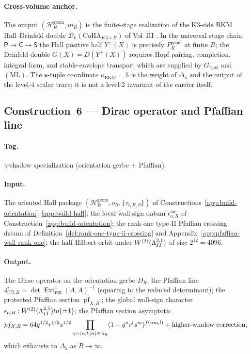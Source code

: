 \paragraph{Cross-volume anchor.}  The output
\((\mathcal H_R^{\mathrm{geom}},m_R)\) is the finite-stage realization
of the K3-side BKM Hall--Drinfeld double
\(\mathcal D_\hbar(\mathrm{CoHA}_{K3\times E})\) of Vol~III
\cite{CYQGVolIII}.  In the universal
stage chain \(\mathsf P\to\mathsf C\to\mathsf S\) the Hall positive half
\(Y^+(X)\) is precisely \(P_R^{\mathrm{geom}}\) at finite \(R\); the
Drinfeld double \(G(X)=D(Y^+(X))\) requires Hopf pairing, completion,
integral form, and stable-envelope transport which are supplied by
\(G_{\gamma,ab}\) and \((\mathrm{ML})\).  The κ-tuple coordinate
\(\kappa_{\mathrm{BKM}}=5\) is the weight of \(\Delta_5\) and the
output of the level-4 scalar trace; it is not a level-2 invariant of
the carrier itself.

\subsection{Construction~6 — Dirac operator and Pfaffian line}
\label{app:build-dirac-pfaffian}

\paragraph{Tag.} \(\gamma\)-shadow specialization
(orientation gerbe + Pfaffian).

\paragraph{Input.}
The oriented Hall package
\((\mathcal H_R^{\mathrm{geom}},o_R,\{\tau_{i,R,S}\})\) of
Constructions~\ref{app:build-orientation}--\ref{app:build-hall}; the
local wall-sign datum
\(\epsilon_{o,R}^{\mathrm{loc}}\) of
Construction~\ref{app:build-orientation}; the rank-one type-II
Pfaffian crossing datum of
Definition~\ref{def:rank-one-type-ii-crossing} and
Appendix~\ref{app:pfaffian-wall-rank-one}; the half-Hilbert orbit
under \(W^{(2)}(\La^{2,1}_{II})\) of size \(2^{12}=4096\).

\paragraph{Output.}
The Dirac operator on the orientation gerbe
\(D_R\); the Pfaffian line
\(\mathscr L_{\mathrm{Pf},R}=
\det\operatorname{Ext}^1_{\mathrm{red}}(A,A)^{-1}\) (squaring to the
reduced determinant); the protected Pfaffian section
\(\operatorname{pf}_{X,R}\); the global wall-sign character
\(\epsilon_{o,R}:W^{(2)}(\La^{2,1}_{II})\to\{\pm1\}\); the Pfaffian
section asymptotic
\[
\operatorname{pf}_{X,R}
=
64q^{1/2}r^{1/2}s^{1/2}
\prod_{\gamma=(n,l,m)\in A_R}
(1-q^nr^ls^m)^{f(nm,l)}+\hbox{higher-window correction},
\]
which exhausts to \(\Delta_5\) as \(R\to\infty\).


